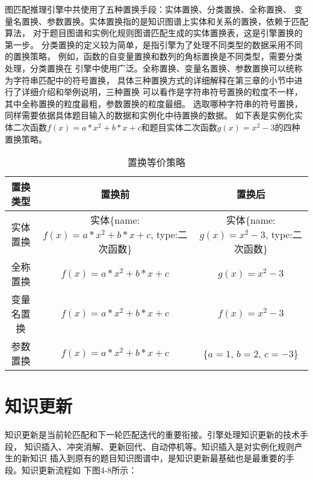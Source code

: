 \documentclass{standalone}
\begin{document}
图匹配推理引擎中共使用了五种置换手段：实体置换、分类置换、全称置换、
变量名置换、参数置换。实体置换指的是知识图谱上实体和关系的置换，依赖于匹配算法，
对于题目图谱和实例化规则图谱匹配生成的实体置换表，这是引擎置换的第一步。
分类置换的定义较为简单，是指引擎为了处理不同类型的数据采用不同的置换策略，
例如，函数的自变量置换和数列的角标置换是不同类型，需要分类处理，分类置换在
引擎中使用广泛。全称置换、变量名置换、参数置换可以统称为字符串匹配中的符号置换，
具体三种置换方式的详细解释在第三章的小节中进行了详细介绍和举例说明，三种置换
可以看作是字符串符号置换的粒度不一样，其中全称置换的粒度最粗，参数置换的粒度最细。
选取哪种字符串的符号置换，同样需要依据具体题目输入的数据和实例化中待置换的数据。
如下表是实例化实体二次函数$f(x)=a*x^{2}+b*x+c$和题目实体二次函数$g(x)=x^{2}-3$的四种置换策略。
\begin{table}[h]
	\caption{置换等价策略} 
	\begin{tabular}{|c|c|c|} 
		\hline  
		置换类型 & 置换前 & 置换后 \\
		\hline 
		实体置换 & \makecell[l]{实体\{name:$f(x)=a*x^{2}+b*x+c$,
		\\type:二次函数\}}   
		& \makecell[l]{实体\{name:$g(x)=x^{2}-3$,
		\\type:二次函数\}}\\
		\hline  
		全称置换 & $f(x)=a*x^{2}+b*x+c$ & $g(x)=x^{2}-3$ \\  
		\hline 
		变量名置换 & $f(x)=a*x^{2}+b*x+c$ & $f(x)=x^{2}-3$ \\  
		\hline 
		参数置换 & $f(x)=a*x^{2}+b*x+c$ & \makecell[l]{\{$a=1$,
		\\$b=2$,
		\\$c=-3$\}}\\  
		\hline  
	\end{tabular}
	\label{tablea}
\end{table}
\section{知识更新}
知识更新是当前轮匹配和下一轮匹配迭代的重要衔接。引擎处理知识更新的技术手段，
知识插入、冲突消解、更新回代、自动停机等。知识插入是对实例化规则产生的新知识
插入到原有的题目知识图谱中，是知识更新最基础也是最重要的手段。知识更新流程如
下图4-8所示：
\end{document}
